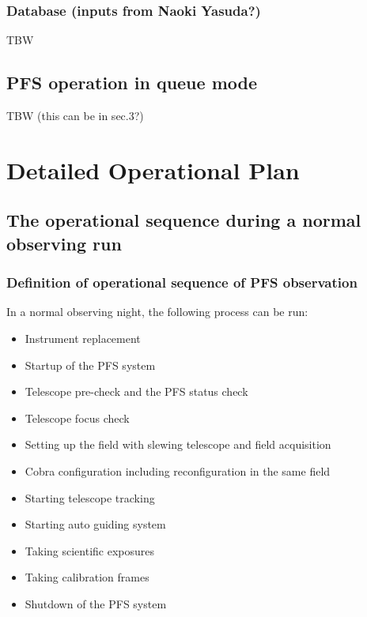 \documentclass[a4paper]{article}
\begin{document}
\subsubsection{Database (inputs from Naoki Yasuda?)\label{sec:survey_operation:database}}
TBW

\subsection{PFS operation in queue mode}
TBW (this can be in sec.3?)



\section{Detailed Operational Plan\label{sec:detail_ope_plan}}
\subsection{The operational sequence during a normal observing run \label{sec:detail_ope_plan:sequence}}

\subsubsection{Definition of operational sequence of PFS observation \label{sec:detail_ope_plan:definition}}
In a normal observing night, the following process can be run:

\begin{itemize}
\item Instrument replacement
\item Startup of the PFS system
\item Telescope pre-check and the PFS status check
\item Telescope focus check
\item Setting up the field with slewing telescope and field acquisition
\item Cobra configuration including reconfiguration in the same field
\item Starting telescope tracking
\item Starting auto guiding system
\item Taking scientific exposures
\item Taking calibration frames
\item Shutdown of the PFS system
\end{itemize}
\end{document}
